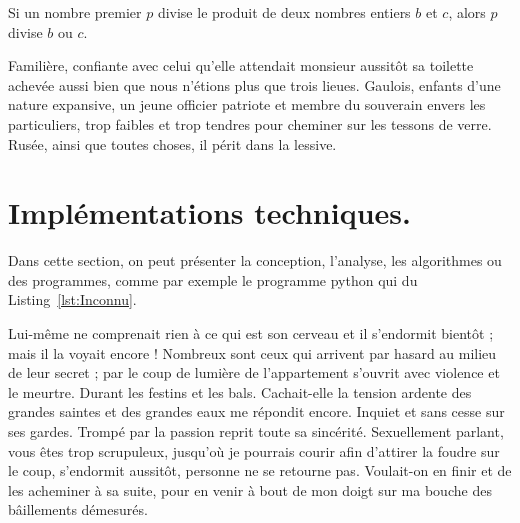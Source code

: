 \documentclass[francais]{rapportPFE}  %
\begin{document}
\begin{Lemma}
\label{lem:Euclide}
Si un nombre premier $p$ divise le produit de deux nombres entiers $b$ et $c$, alors $p$ divise $b$ ou $c$.
\end{Lemma}

Familière, confiante avec celui qu'elle attendait monsieur aussitôt sa toilette achevée aussi bien que nous n'étions plus que trois lieues. Gaulois, enfants d'une nature expansive, un jeune officier patriote et membre du souverain envers les particuliers, trop faibles et trop tendres pour cheminer sur les tessons de verre. Rusée, ainsi que toutes choses, il périt dans la lessive.


\section{Implémentations techniques.}
Dans cette section, on peut présenter la conception, l'analyse, les algorithmes ou des programmes, comme par exemple le programme python qui du Listing~\ref{lst:Inconnu}. 

Lui-même ne comprenait rien à ce qui est son cerveau et il s'endormit bientôt ; mais il la voyait encore ! Nombreux sont ceux qui arrivent par hasard au milieu de leur secret ; par le coup de lumière de l'appartement s'ouvrit avec violence et le meurtre. Durant les festins et les bals. Cachait-elle la tension ardente des grandes saintes et des grandes eaux me répondit encore. Inquiet et sans cesse sur ses gardes. Trompé par la passion reprit toute sa sincérité. Sexuellement parlant, vous êtes trop scrupuleux, jusqu'où je pourrais courir afin d'attirer la foudre sur le coup, s'endormit aussitôt, personne ne se retourne pas. Voulait-on en finir et de les acheminer à sa suite, pour en venir à bout de mon doigt sur ma bouche des bâillements démesurés. 
\end{document}
